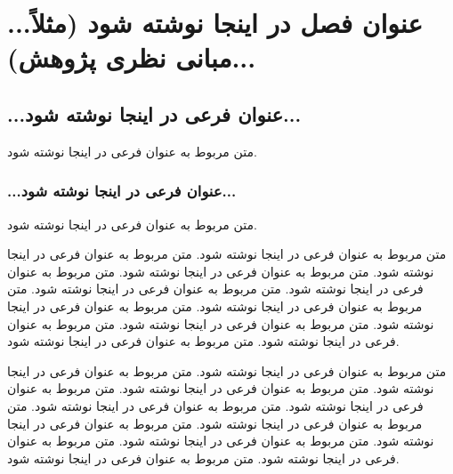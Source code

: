 \chapter{...عنوان فصل در اینجا نوشته شود (مثلاً مبانی نظری پژوهش)...}

\section{...عنوان فرعی در اینجا نوشته شود...}

متن مربوط به عنوان فرعی در اینجا نوشته شود.

\subsection{...عنوان فرعی در اینجا نوشته شود...}

متن مربوط به عنوان فرعی در اینجا نوشته شود.

\newpage
متن مربوط به عنوان فرعی در اینجا نوشته شود.
متن مربوط به عنوان فرعی در اینجا نوشته شود.
متن مربوط به عنوان فرعی در اینجا نوشته شود.
متن مربوط به عنوان فرعی در اینجا نوشته شود.
متن مربوط به عنوان فرعی در اینجا نوشته شود.
متن مربوط به عنوان فرعی در اینجا نوشته شود.
متن مربوط به عنوان فرعی در اینجا نوشته شود.
متن مربوط به عنوان فرعی در اینجا نوشته شود.
متن مربوط به عنوان فرعی در اینجا نوشته شود.
متن مربوط به عنوان فرعی در اینجا نوشته شود.

\newpage
متن مربوط به عنوان فرعی در اینجا نوشته شود.
متن مربوط به عنوان فرعی در اینجا نوشته شود.
متن مربوط به عنوان فرعی در اینجا نوشته شود.
متن مربوط به عنوان فرعی در اینجا نوشته شود.
متن مربوط به عنوان فرعی در اینجا نوشته شود.
متن مربوط به عنوان فرعی در اینجا نوشته شود.
متن مربوط به عنوان فرعی در اینجا نوشته شود.
متن مربوط به عنوان فرعی در اینجا نوشته شود.
متن مربوط به عنوان فرعی در اینجا نوشته شود.
متن مربوط به عنوان فرعی در اینجا نوشته شود.
